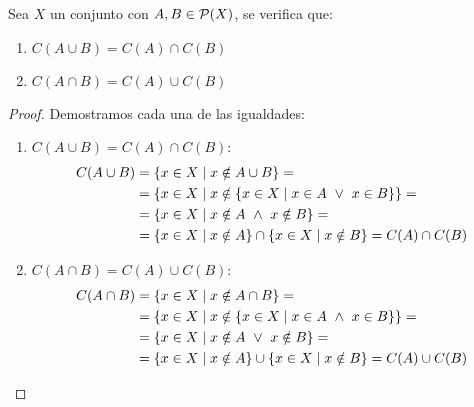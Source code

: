 \begin{prop}
    Sea $X$ un conjunto con $A, B \in \mathcal{P}(X)$, se verifica que:
    \begin{enumerate}
        \item $C(A \cup B) = C(A) \cap C(B)$
        \item $C(A \cap B) = C(A) \cup C(B)$
    \end{enumerate}
\end{prop}
\begin{proof} Demostramos cada una de las igualdades:
\begin{enumerate}
    \item $C(A \cup B) = C(A) \cap C(B)$:
    \begin{equation*}
        \begin{split}
            C(A \cup B) &= \{x \in X \mid x \notin A \cup B\} =\\
            & =\{x \in X \mid x \notin \{x \in X \mid x \in A \ \lor \  x \in B\} \} =\\
            & = \{x \in X \mid x \notin A \ \land \  x \notin B \} =\\
            & =\{x \in X \mid x \notin A\} \cap \{x \in X \mid x \notin B\} = C(A) \cap C(B)
        \end{split}
    \end{equation*}

    \item $C(A \cap B) = C(A) \cup C(B)$:
    \begin{equation*}
        \begin{split}
            C(A \cap B) &= \{x \in X \mid x \notin A \cap B\} =\\
            & =\{x \in X \mid x \notin \{x \in X \mid x \in A \ \land \  x \in B\} \} =\\
            & = \{x \in X \mid x \notin A \ \lor \  x \notin B \} =\\
            & =\{x \in X \mid x \notin A\} \cup \{x \in X \mid x \notin B\} = C(A) \cup C(B)
        \end{split}
    \end{equation*}
\end{enumerate}
\end{proof}

